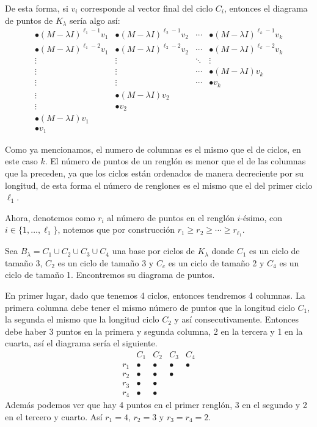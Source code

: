 De esta forma, si $v_i$ corresponde al vector final del ciclo $C_i$, entonces el diagrama de puntos de $K_\lambda
$ sería algo así:
\[
  \begin{array}{llll} 
    \bullet (M-\lambda I)^{\ell_1-1}v_1 & \bullet (M-\lambda I)^{\ell_2-1}v_2 & \cdots & \bullet (M-\lambda I)^{\ell_k-1}v_k  \\
    \bullet (M-\lambda I)^{\ell_1-2}v_1 & \bullet (M-\lambda I)^{\ell_2-2}v_2 & \cdots & \bullet (M-\lambda I)^{\ell_k-2}v_k  \\
    \vdots & \vdots & \ddots & \vdots \\
    \vdots & \vdots & \cdots & \bullet (M-\lambda I)v_k \\
    \vdots & \vdots & \cdots & \bullet v_k \\
    \vdots & \bullet (M-\lambda I)v_2 \\
    \vdots & \bullet v_2 \\
    \bullet (M-\lambda I)v_1 \\
    \bullet v_1 
  \end{array}
\]

Como ya mencionamos, el numero de columnas es el mismo que el de ciclos, en este caso $k$. El número de puntos de un renglón es menor que el de las columnas que la preceden, ya que los ciclos están ordenados de manera decreciente por su longitud, de esta forma el número de renglones es el mismo que el del primer ciclo $\ell_1$. 

Ahora, denotemos como $r_i$ al número de puntos en el renglón $i$-ésimo, con $i \in \{1,\ldots,\ell_1\}$, notemos que por construcción $r_1 \geq r_2 \geq \cdots \geq r_{\ell_1}$.

\begin{example}
  Sea $B_\lambda = C_1 \cup C_2 \cup C_3 \cup C_4$ una base por ciclos de $K_\lambda$ donde $C_1$ es un ciclo de tamaño 3, $C_2$ es un ciclo de tamaño 3 y $C_c$ es un ciclo de tamaño 2 y $C_4$ es un ciclo de tamaño 1. Encontremos su diagrama de puntos.

  \examplesolution

  En primer lugar, dado que tenemos 4 ciclos, entonces tendremos 4 columnas. La primera columna debe tener el mismo número de puntos que la longitud ciclo $C_1$, la segunda el mismo que la longitud ciclo $C_2$ y así consecutivamente. Entonces debe haber 3 puntos en la primera y segunda columna, 2 en la tercera y 1 en la cuarta, así el diagrama sería el siguiente.
  \[
    \begin{array}{ccccc}
      & C_1 & C_2 & C_3 & C_4 \\
      r_1 & \bullet & \bullet & \bullet & \bullet \\
      r_2 & \bullet & \bullet & \bullet\\
      r_3 & \bullet & \bullet \\
      r_4 & \bullet & \bullet 
    \end{array}
  \]
  Además podemos ver que hay 4 puntos en el primer renglón, 3 en el segundo y 2 en el tercero y cuarto. Así $r_1 = 4$, $r_2 = 3$ y $r_3 = r_4 = 2$.
\end{example}

